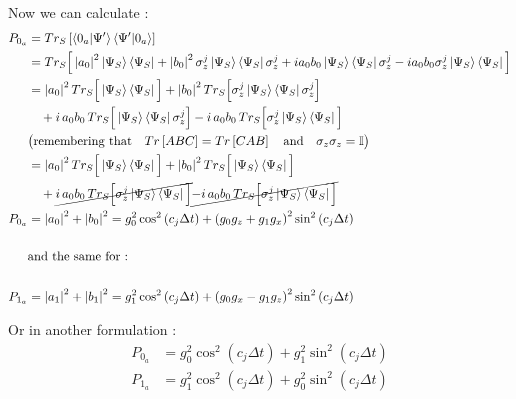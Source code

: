 \documentclass[a4paper,12pt]{article}
\begin{document}
Now we can calculate :
\begin{align}
	P_{0_{a}} & = Tr_{S} \left[\braket{0_a|\Psi'}\braket{\Psi'|0_a} 	\right] \notag \\
	& = Tr_{S} \Big[ \left|a_{0}\right|^{2} 	\ket{\Psi_{S}}\bra{\Psi_{S}} + \left|b_{0}\right|^{2} \sigma_{z}^{j} \ket{\Psi_{S}}\bra{\Psi_{S}} \sigma_{z}^{j} + i a_{0}b_{0}\ket{\Psi_{S}}\bra{\Psi_{S}} \sigma_{z}^{j} -  i a_{0}b_{0} \sigma_{z}^{j} \ket{\Psi_{S}}\bra{\Psi_{S}} \Big] \notag \\
	& = \left|a_{0}\right|^{2} Tr_{S} \Big[ 	\ket{\Psi_{S}}\bra{\Psi_{S}} \Big] + \left|b_{0}\right|^{2} Tr_{S} \Big[ \sigma_{z}^{j} \ket{\Psi_{S}}\bra{\Psi_{S}} \sigma_{z}^{j} \Big] \notag \\
	& \quad + i \,a_{0} b_{0} \, Tr_{S} \Big[ 	\ket{\Psi_{S}}\bra{\Psi_{S}} \sigma_{z}^{j} \Big] - i \, a_{0} b_{0} \, Tr_{S} \Big[ \sigma_{z}^{j} \ket{\Psi_{S}}\bra{\Psi_{S}} \Big] \notag \\
	& \big(\text{remembering that} \quad Tr \left[ABC\right] = Tr 	\left[CAB\right] \quad \text{and} \quad \sigma_{z} \sigma_{z} = \mathbb{I} \big) \notag \\
	& = \left|a_{0}\right|^{2} Tr_{S} \Big[ 	\ket{\Psi_{S}}\bra{\Psi_{S}} \Big] + \left|b_{0}\right|^{2} Tr_{S} \Big[  \ket{\Psi_{S}}\bra{\Psi_{S}} \Big] \notag \\
	& \quad + \cancel{i \,a_{0} b_{0} \, Tr_{S} \Big[ \sigma_{z}^{j} 	\ket{\Psi_{S}}\bra{\Psi_{S}} \Big]} \cancel{- i \, a_{0} b_{0} \, Tr_{S} \Big[ \sigma_{z}^{j} \ket{\Psi_{S}}\bra{\Psi_{S}} \Big]} \notag \\
	P_{0_{a}} & = \left|a_{0}\right|^{2} + \left|b_{0}\right|^{2} = 	g_{0}^{2} \cos^{2}{\left(c_{j}\Delta t\right)} + \left(g_{0} g_{z} + g_{1}g_{x} \right)^{2} \sin^{2}{\left(c_{j}\Delta t\right)} \label{eq_P0_value} \\
	\notag \\
	& \text{and the same for :} \notag \\
	\notag \\
	P_{1_{a}} &= \left|a_{1}\right|^{2} + \left|b_{1}\right|^{2} = 	g_{1}^{2} \cos^{2}{\left(c_{j}\Delta t\right)} + \left(g_{0} g_{x} - g_{1}g_{z} \right)^{2} \sin^{2}{\left(c_{j}\Delta t\right)} \label{eq_P1_value}
\end{align}

Or in another formulation :
\begin{align}
	P_{0_a} & = g_0^2 \cos^2(c_j \Delta t) + g_1^2 \sin^2(c_j \Delta t) \label{eq:P0a_final} \\
	P_{1_a} & = g_1^2 \cos^2(c_j \Delta t) + g_0^2 \sin^2(c_j \Delta t) \label{eq:P1a_final}
\end{align}
\end{document}
